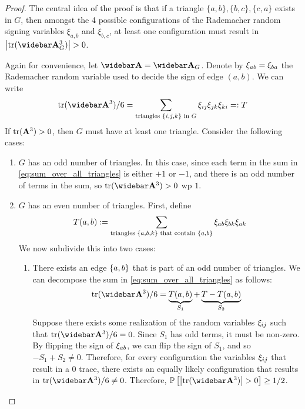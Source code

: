 \begin{proof}
    The central idea of the proof is that if a triangle $\{a, b\}, \{b, c\}, \{c, a\}$ exists in $G$, then amongst the 4 possible configurations of the Rademacher random signing variables $\xi_{a,b}$ and $\xi_{b,c}$, at least one configuration must result in $\abs{\trace{\As_G^3}} > 0$. 

    Again for convenience, let $\As = \As_G$. Denote by $\xi_{ab} = \xi_{ba}$ the Rademacher random variable used to decide the sign of edge $(a,b)$. We can write
    \begin{align}\label{eq:sum_over_all_triangles}
        \trace{\As^3}/6 = \sum_{\text{triangles } \curs{i,j,k} \text{ in } G}  \rad_{ij} \rad_{jk} \rad_{ki} =: T
    \end{align}
    If $\mathrm{tr}(\mathbf{A}^3) > 0$, then $G$ must have at least one triangle. Consider the following cases:
    \begin{enumerate}
        \item $G$ has an odd number of triangles. In this case, since each term in the sum in \eqref{eq:sum_over_all_triangles} is either $+1$ or $-1$, and there is an odd number of terms in the sum, so $\trace{\As^3} > 0$ wp $1$.
        \item $G$ has an even number of triangles. First, define 
        \begin{align*}
            T(a, b) := \sum_{\text{triangles } \left\{ a,b,k \right\} \text{ that contain }\left\{ a,b \right\}} \xi_{ab} \xi_{bk} \xi_{ak}
        \end{align*}
        We now subdivide this into two cases:
        \begin{enumerate}
            \item There exists an edge $\left\{ a,b \right\}$ that is part of an odd number of triangles. We can decompose the sum in \eqref{eq:sum_over_all_triangles} as follows:
            \begin{align*}
                \trace{\As^3}/6 = \underbrace{T(a,b)}_{S_1} + \underbrace{T-T(a,b)}_{S_2}
            \end{align*}
            Suppose there exists some realization of the random variables $\xi_{ij}$ such that $\trace{\As^3}/6 = 0$. Since $S_1$ has odd terms, it must be non-zero. By flipping the sign of $\xi_{ab}$, we can flip the sign of $S_1$, and so $-S_1 + S_2 \neq 0$. Therefore, for every configuration the variables $\xi_{ij}$ that result in a 0 trace, there exists an equally likely configuration that results in $\trace{\As^3}/6 \neq 0$. Therefore, $\Prob{\abs{\trace{\As^3}} > 0} \geq 1/2$.

\end{enumerate}
\end{enumerate}
\end{proof}
